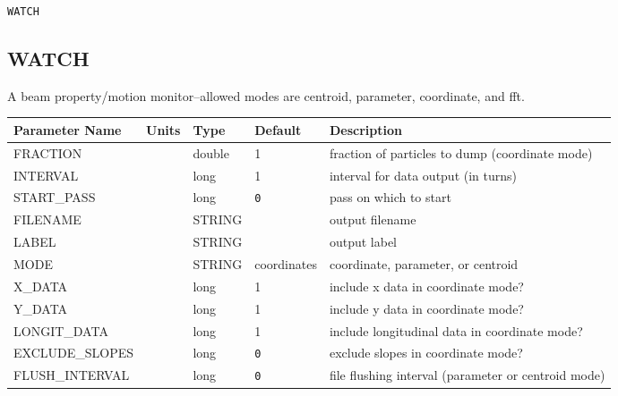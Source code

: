 \vspace*{0.5in}

\begin{latexonly}
\newpage
\begin{center}{\Large\verb|WATCH|}\end{center}
\end{latexonly}\subsection{WATCH}
A beam property/motion monitor--allowed modes are centroid, parameter, coordinate, and fft.
\\
\begin{tabular}{|l|l|l|l|p{\descwidth}|} \hline
Parameter Name & Units & Type & Default & Description \\ \hline 
FRACTION &  & double &   1 & fraction of particles to dump (coordinate mode)  \\ \hline 
INTERVAL &  & long &   1               & interval for data output (in turns)  \\ \hline 
START\_PASS &  & long &  \verb|0| & pass on which to start  \\ \hline 
FILENAME &  & STRING &                   & output filename  \\ \hline 
LABEL &  & STRING &                   & output label  \\ \hline 
MODE &  & STRING &   coordinates     & coordinate, parameter, or centroid  \\ \hline 
X\_DATA &  & long &   1               & include x data in coordinate mode?  \\ \hline 
Y\_DATA &  & long &   1               & include y data in coordinate mode?  \\ \hline 
LONGIT\_DATA &  & long &   1               & include longitudinal data in coordinate mode?  \\ \hline 
EXCLUDE\_SLOPES &  & long &  \verb|0| & exclude slopes in coordinate mode?  \\ \hline 
FLUSH\_INTERVAL &  & long &  \verb|0| & file flushing interval (parameter or centroid mode)  \\ \hline 
\end{tabular}

